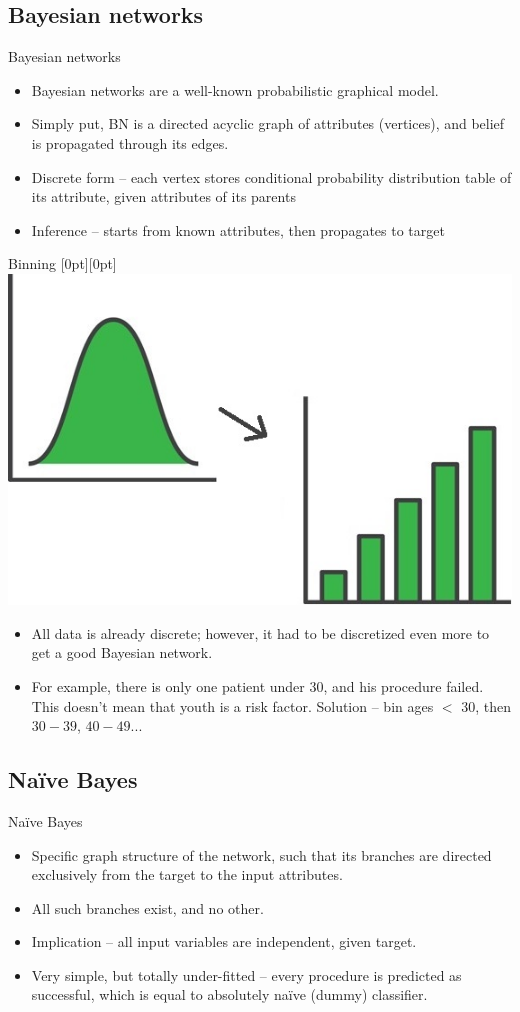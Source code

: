 \documentclass[hyperref={bookmarks=false}]{beamer}
\newcommand{\lenitem}[2][.51\linewidth]{\parbox[t]{#1}{\strut #2\strut}}
\begin{document}
\subsection{Bayesian networks}
\begin{frame}{Bayesian networks}
\begin{itemize}
    \item Bayesian networks are a well-known probabilistic graphical model.
    \item Simply put, BN is a directed acyclic graph of attributes (vertices), and belief is propagated through its edges.
    \item Discrete form -- each vertex stores conditional probability distribution table of its attribute, given attributes of its parents
    \item Inference -- starts from known attributes, then propagates to target
\end{itemize}
\end{frame}

\begin{frame}{Binning}
\mbox{}\hfill\raisebox{-\height}[0pt][0pt]{\includegraphics[width=.42\linewidth]{binning.jpeg}}
\vspace*{-\baselineskip}

\begin{itemize}
    \item \lenitem{All data is already discrete; however, it had to be discretized even more to get a good Bayesian network.}

    \item \lenitem{For example, there is only one patient under 30, and his procedure failed. This doesn't mean that youth is a risk factor. Solution -- bin ages $<$ 30, then $30-39$, $40-49$...}
\end{itemize}
\end{frame}

\subsection{Naïve Bayes}
\begin{frame}{Naïve Bayes}
\begin{itemize}
    \item Specific graph structure of the network, such that its branches are directed exclusively from the target to the input attributes.
    \item All such branches exist, and no other.
    \item Implication -- all input variables are independent, given target.
    \item Very simple, but totally under-fitted -- every procedure is predicted as successful, which is equal to absolutely naïve (dummy) classifier.
\end{itemize}
\end{frame}
\end{document}
